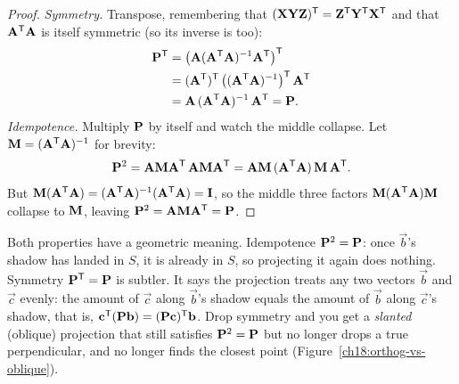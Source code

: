 \begin{proof}
\emph{Symmetry.} Transpose, remembering that $(\mathbf{XYZ})^{\mathsf{T}}=\mathbf{Z}^{\mathsf{T}}\mathbf{Y}^{\mathsf{T}}\mathbf{X}^{\mathsf{T}}$ and that
$\mathbf{A}^{\mathsf{T}}\mathbf{A}$ is itself symmetric (so its inverse is too):
\begin{align*}
  \mathbf{P}^{\mathsf{T}} &= \big(\mathbf{A}(\mathbf{A}^{\mathsf{T}}\mathbf{A})^{-1}\mathbf{A}^{\mathsf{T}}\big)^{\mathsf{T}}\\
            &= (\mathbf{A}^{\mathsf{T}})^{\mathsf{T}}\,\big((\mathbf{A}^{\mathsf{T}}\mathbf{A})^{-1}\big)^{\mathsf{T}}\,\mathbf{A}^{\mathsf{T}}\\
            &= \mathbf{A}\,(\mathbf{A}^{\mathsf{T}}\mathbf{A})^{-1}\,\mathbf{A}^{\mathsf{T}} = \mathbf{P}.
\end{align*}
\emph{Idempotence.} Multiply $\mathbf{P}$ by itself and watch the middle collapse. Let
$\mathbf{M}=(\mathbf{A}^{\mathsf{T}}\mathbf{A})^{-1}$ for brevity:
\[
  \mathbf{P}^2 = \mathbf{A}\mathbf{M}\mathbf{A}^{\mathsf{T}}\,\mathbf{A}\mathbf{M}\mathbf{A}^{\mathsf{T}}
  = \mathbf{A}\mathbf{M}\,(\mathbf{A}^{\mathsf{T}}\mathbf{A})\,\mathbf{M}\,\mathbf{A}^{\mathsf{T}}.
\]
But $\mathbf{M}(\mathbf{A}^{\mathsf{T}}\mathbf{A}) = (\mathbf{A}^{\mathsf{T}}\mathbf{A})^{-1}(\mathbf{A}^{\mathsf{T}}\mathbf{A}) = \mathbf{I}$, so the middle
three factors $\mathbf{M}(\mathbf{A}^{\mathsf{T}}\mathbf{A})\mathbf{M}$ collapse to $\mathbf{M}$, leaving
$\mathbf{P}^2 = \mathbf{A}\mathbf{M}\mathbf{A}^{\mathsf{T}} = \mathbf{P}$.
\end{proof}

\begin{intuitionbox}
Both properties have a geometric meaning. Idempotence $\mathbf{P}^2=\mathbf{P}$: once $\vec{b}$'s shadow
has landed in $S$, it is already in $S$, so projecting it again does nothing. Symmetry
$\mathbf{P}^{\mathsf{T}}=\mathbf{P}$ is subtler. It says the projection treats any two vectors $\vec{b}$ and
$\vec{c}$ evenly: the amount of $\vec{c}$ along $\vec{b}$'s shadow equals the amount of $\vec{b}$
along $\vec{c}$'s shadow, that is, $\mathbf{c}^{\mathsf{T}}(\mathbf{P}\mathbf{b}) = (\mathbf{P}\mathbf{c})^{\mathsf{T}}\mathbf{b}$. Drop
symmetry and you get a \emph{slanted} (oblique) projection that still satisfies
$\mathbf{P}^2=\mathbf{P}$ but no longer drops a true perpendicular, and no longer finds the closest point
(Figure~\ref{ch18:orthog-vs-oblique}).
\end{intuitionbox}

